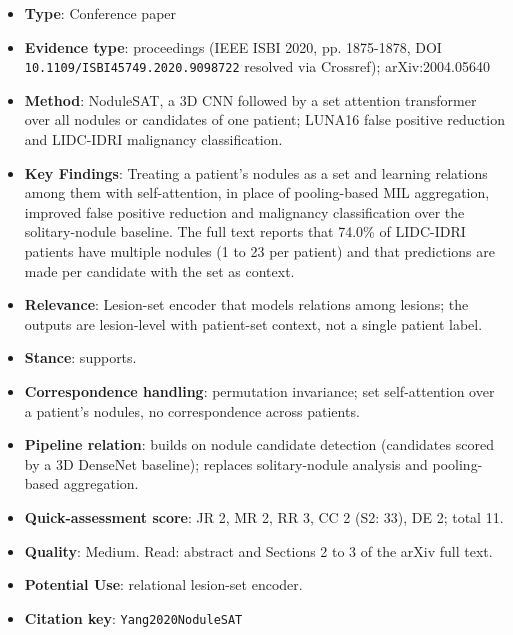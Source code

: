 \documentclass[journal,onecolumn]{IEEEtran}
\begin{document}
\begin{itemize}

\item{} \textbf{Type}: Conference paper

\item{} \textbf{Evidence type}: proceedings (IEEE ISBI 2020, pp. 1875-1878, DOI \nolinkurl{10.1109/ISBI45749.2020.9098722} resolved via Crossref); arXiv:2004.05640

\item{} \textbf{Method}: NoduleSAT, a 3D CNN followed by a set attention transformer over all nodules or candidates of one patient; LUNA16 false positive reduction and LIDC-IDRI malignancy classification.

\item{} \textbf{Key Findings}: Treating a patient's nodules as a set and learning relations among them with self-attention, in place of pooling-based MIL aggregation, improved false positive reduction and malignancy classification over the solitary-nodule baseline. The full text reports that 74.0\% of LIDC-IDRI patients have multiple nodules (1 to 23 per patient) and that predictions are made per candidate with the set as context.

\item{} \textbf{Relevance}: Lesion-set encoder that models relations among lesions; the outputs are lesion-level with patient-set context, not a single patient label.

\item{} \textbf{Stance}: supports.

\item{} \textbf{Correspondence handling}: permutation invariance; set self-attention over a patient's nodules, no correspondence across patients.

\item{} \textbf{Pipeline relation}: builds on nodule candidate detection (candidates scored by a 3D DenseNet baseline); replaces solitary-nodule analysis and pooling-based aggregation.

\item{} \textbf{Quick-assessment score}: JR 2, MR 2, RR 3, CC 2 (S2: 33), DE 2; total 11.

\item{} \textbf{Quality}: Medium. Read: abstract and Sections 2 to 3 of the arXiv full text.

\item{} \textbf{Potential Use}: relational lesion-set encoder.

\item{} \textbf{Citation key}: \texttt{Yang2020NoduleSAT}

\end{itemize}
\end{document}
